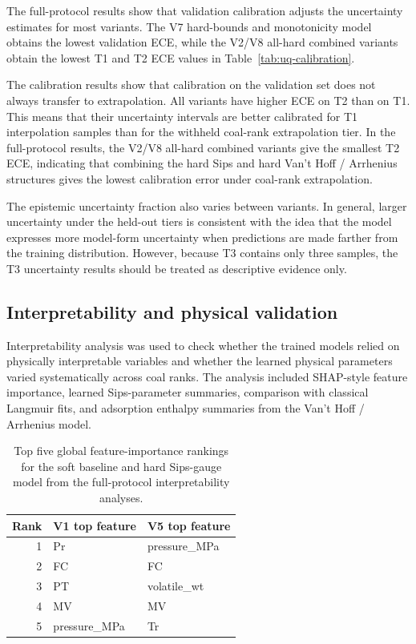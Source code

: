 \documentclass[11pt]{article}
\begin{document}
The full-protocol results show that validation calibration adjusts the uncertainty
estimates for most variants. The V7 hard-bounds and monotonicity model obtains
the lowest validation ECE, while the V2/V8 all-hard combined variants obtain
the lowest T1 and T2 ECE values in Table~\ref{tab:uq-calibration}.

The calibration results show that calibration on the validation set does not
always transfer to extrapolation. All variants have higher ECE on T2 than on
T1. This means that their uncertainty intervals are better calibrated for T1
interpolation samples than for the withheld
coal-rank extrapolation tier. In the full-protocol results, the V2/V8 all-hard combined
variants give the smallest T2 ECE, indicating that combining the hard Sips and
hard Van't Hoff / Arrhenius structures gives the lowest calibration error under
coal-rank extrapolation.

The epistemic uncertainty fraction also varies between variants. In general,
larger uncertainty under the held-out tiers is consistent with the idea that
the model expresses more model-form uncertainty when predictions are made
farther from the training distribution. However, because T3 contains only three
samples, the T3 uncertainty results should be treated as descriptive evidence
only.

\subsection{Interpretability and physical validation}

Interpretability analysis was used to check whether the trained models relied
on physically interpretable variables and whether the learned physical
parameters varied systematically across coal ranks. The analysis included SHAP-style feature
importance, learned Sips-parameter summaries, comparison with classical
Langmuir fits, and adsorption enthalpy summaries from the Van't Hoff /
Arrhenius model.

\begin{table}[htbp]
    \centering
    \begin{tabular}{rll}
        \toprule
        \textbf{Rank} & \textbf{V1 top feature} & \textbf{V5 top feature} \\
        \midrule
        1             & Pr                      & pressure\_MPa           \\
        2             & FC                      & FC                      \\
        3             & PT                      & volatile\_wt            \\
        4             & MV                      & MV                      \\
        5             & pressure\_MPa           & Tr                      \\
        \bottomrule
    \end{tabular}
    \caption{Top five global feature-importance rankings for the soft baseline
        and hard Sips-gauge model from the full-protocol interpretability analyses.}
    \label{tab:interpretability-shap}
\end{table}
\end{document}
